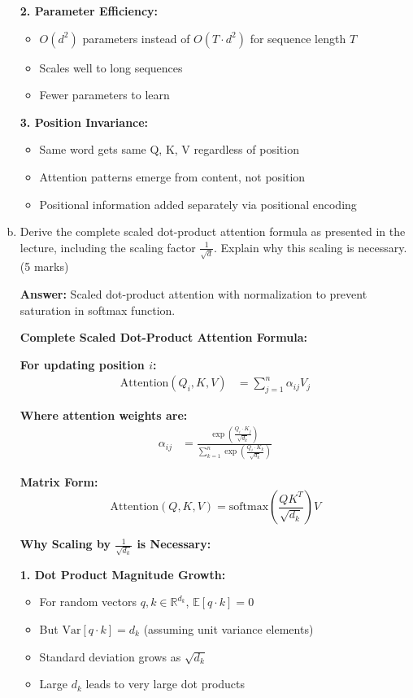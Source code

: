 \documentclass[12pt]{article}
\newcommand{\answer}[1]{{\color{answercolor}\textbf{Answer:} #1}}
\newcommand{\explanation}[1]{{\color{explanationcolor}#1}}
\begin{document}
\begin{enumerate}[(a)]
{    \textbf{2. Parameter Efficiency:}
    \begin{itemize}
        \item $O(d^2)$ parameters instead of $O(T \cdot d^2)$ for sequence length $T$
        \item Scales well to long sequences
        \item Fewer parameters to learn
    \end{itemize}
    
    \textbf{3. Position Invariance:}
    \begin{itemize}
        \item Same word gets same Q, K, V regardless of position
        \item Attention patterns emerge from content, not position
        \item Positional information added separately via positional encoding
    \end{itemize}
    }
    
    \item Derive the complete scaled dot-product attention formula as presented in the lecture, including the scaling factor $\frac{1}{\sqrt{d}}$. Explain why this scaling is necessary. \hfill (5 marks)
    
    \answer{Scaled dot-product attention with normalization to prevent saturation in softmax function.}
    
    \explanation{
    \textbf{Complete Scaled Dot-Product Attention Formula:}
    
    \textbf{For updating position $i$:}
    \begin{align}
        \text{Attention}(Q_i, K, V) &= \sum_{j=1}^n \alpha_{ij} V_j
    \end{align}
    
    \textbf{Where attention weights are:}
    \begin{align}
        \alpha_{ij} &= \frac{\exp\left(\frac{Q_i \cdot K_j}{\sqrt{d_k}}\right)}{\sum_{k=1}^n \exp\left(\frac{Q_i \cdot K_k}{\sqrt{d_k}}\right)}
    \end{align}
    
    \textbf{Matrix Form:}
    $$\text{Attention}(Q, K, V) = \text{softmax}\left(\frac{QK^T}{\sqrt{d_k}}\right)V$$
    
    \textbf{Why Scaling by $\frac{1}{\sqrt{d_k}}$ is Necessary:}
    
    \textbf{1. Dot Product Magnitude Growth:}
    \begin{itemize}
        \item For random vectors $q, k \in \mathbb{R}^{d_k}$, $\mathbb{E}[q \cdot k] = 0$
        \item But $\text{Var}[q \cdot k] = d_k$ (assuming unit variance elements)
        \item Standard deviation grows as $\sqrt{d_k}$
        \item Large $d_k$ leads to very large dot products
    \end{itemize}
    
}
\end{enumerate}
\end{document}
